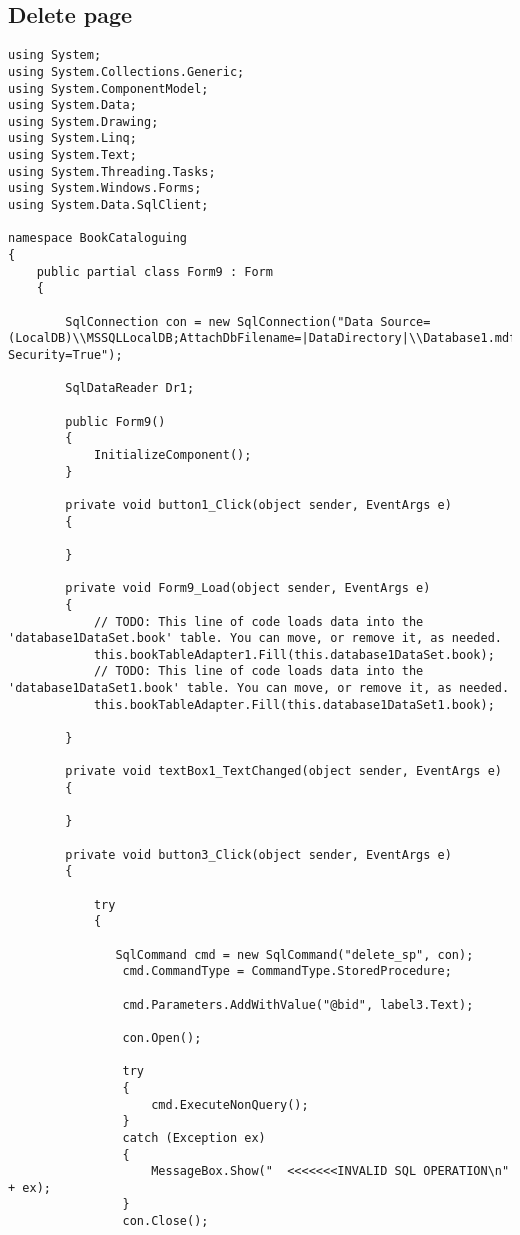 \subsection{Delete page}
\begin{lstlisting}
using System;
using System.Collections.Generic;
using System.ComponentModel;
using System.Data;
using System.Drawing;
using System.Linq;
using System.Text;
using System.Threading.Tasks;
using System.Windows.Forms;
using System.Data.SqlClient;

namespace BookCataloguing
{
    public partial class Form9 : Form
    {

        SqlConnection con = new SqlConnection("Data Source=(LocalDB)\\MSSQLLocalDB;AttachDbFilename=|DataDirectory|\\Database1.mdf;Integrated Security=True");
       
        SqlDataReader Dr1;

        public Form9()
        {
            InitializeComponent();
        }

        private void button1_Click(object sender, EventArgs e)
        {

        }

        private void Form9_Load(object sender, EventArgs e)
        {
            // TODO: This line of code loads data into the 'database1DataSet.book' table. You can move, or remove it, as needed.
            this.bookTableAdapter1.Fill(this.database1DataSet.book);
            // TODO: This line of code loads data into the 'database1DataSet1.book' table. You can move, or remove it, as needed.
            this.bookTableAdapter.Fill(this.database1DataSet1.book);
           
        }

        private void textBox1_TextChanged(object sender, EventArgs e)
        {

        }

        private void button3_Click(object sender, EventArgs e)
        {
            
            try
            {
               
               SqlCommand cmd = new SqlCommand("delete_sp", con);
                cmd.CommandType = CommandType.StoredProcedure;

                cmd.Parameters.AddWithValue("@bid", label3.Text);

                con.Open();
               
                try
                {
                    cmd.ExecuteNonQuery();
                }
                catch (Exception ex)
                {
                    MessageBox.Show("  <<<<<<<INVALID SQL OPERATION\n" + ex);
                }
                con.Close();
\end{lstlisting}

